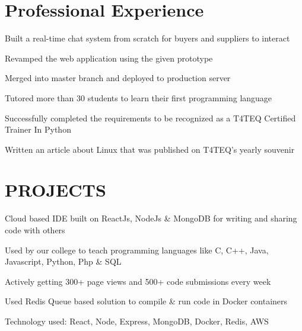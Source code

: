 \documentclass[]{deedy-resume-openfont}
\begin{document}
\hfill
\begin{minipage}[t]{0.66\textwidth} 


\section{Professional Experience}

\vspace{\topsep} %
\begin{tightemize}
\item Built a real-time chat system from scratch for buyers and suppliers to interact
\item Revamped the web application using the given prototype
\item Merged into master branch and deployed to production server
\end{tightemize}
\sectionsep

\begin{tightemize}
\item Tutored more than 30 students to learn their first programming language
\item Successfully completed the requirements to be recognized as a T4TEQ Certified Trainer In Python
\item Written an article about Linux that was published on T4TEQ's yearly souvenir
\end{tightemize}
\sectionsep


\section{PROJECTS}

\begin{tightemize}
\item Cloud based IDE built on ReactJs, NodeJs \& MongoDB for writing and sharing code with others
\item Used by our college to teach programming languages like C, C++, Java, Javascript, Python, Php \& SQL
\item Actively getting 300+ page views and 500+ code submissions every week
\item Used Redis Queue based solution to compile \& run code in Docker containers
\item Technology used: React, Node, Express, MongoDB, Docker, Redis, AWS
\end{tightemize}
\sectionsep


\end{minipage}
\end{document}
